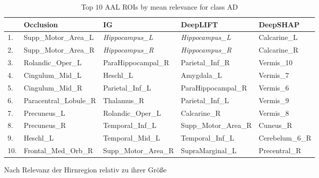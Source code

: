 \begin{table}
	\begin{subtable}{\textwidth}
		\begin{tabularx}{\textwidth}{lXXXX}
			\toprule
			    & Occlusion              & IG                    & DeepLIFT              & DeepSHAP        \\
			\midrule
			1.  & Supp\_Motor\_Area\_L   & \emph{Hippocampus\_L} & \emph{Hippocampus\_L} & Calcarine\_L    \\
			2.  & Supp\_Motor\_Area\_R   & \emph{Hippocampus\_R} & \emph{Hippocampus\_R} & Calcarine\_R    \\
			3.  & Rolandic\_Oper\_L      & ParaHippocampal\_R    & Parietal\_Inf\_R      & Vermis\_10      \\
			4.  & Cingulum\_Mid\_L       & Heschl\_L             & Amygdala\_L           & Vermis\_7       \\
			5.  & Cingulum\_Mid\_R       & Parietal\_Inf\_L      & ParaHippocampal\_R    & Vermis\_6       \\
			6.  & Paracentral\_Lobule\_R & Thalamus\_R           & Parietal\_Inf\_L      & Vermis\_9       \\
			7.  & Precuneus\_L           & Rolandic\_Oper\_L     & Calcarine\_R          & Vermis\_8       \\
			8.  & Precuneus\_R           & Temporal\_Inf\_L      & Supp\_Motor\_Area\_R  & Cuneus\_R       \\
			9.  & Heschl\_L              & Temporal\_Mid\_L      & Temporal\_Inf\_L      & Cerebelum\_6\_R \\
			10. & Frontal\_Med\_Orb\_R   & Supp\_Motor\_Area\_R  & SupraMarginal\_L      & Precentral\_R   \\
		\end{tabularx}
		\caption{Nach Relevanz der Hirnregion relativ zu ihrer Größe}
	\end{subtable}

	\caption{Top $10$ AAL ROIs by mean relevance for class AD}
	\label{tab:top10}
\end{table}
